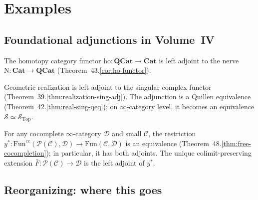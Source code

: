 \section{Examples}
\label{sec:adjunction-examples}

\subsection{Foundational adjunctions in Volume~IV}

\begin{example_thm}
\label{ex:ho-N-adj}
The homotopy category functor $\mathrm{ho} : \mathbf{QCat} \to \mathbf{Cat}$
is left adjoint to the nerve $\mathrm{N} : \mathbf{Cat} \to \mathbf{QCat}$
(Theorem~43.\ref{cor:ho-functor}).
\end{example_thm}

\begin{example_thm}
\label{ex:realization-sing-adj}
Geometric realization is left adjoint to the singular complex functor
(Theorem~39.\ref{thm:realization-sing-adj}). The adjunction is a
Quillen equivalence (Theorem~42.\ref{thm:real-sing-qeq}); on
$\infty$-category level, it becomes an equivalence
$\mathcal{S} \simeq \mathcal{S}_{\mathrm{Top}}$.
\end{example_thm}

\begin{example_thm}
\label{ex:yoneda-adj}
For any cocomplete $\infty$-category $\mathcal{D}$ and small $\mathcal{C}$,
the restriction $y^* : \mathrm{Fun}^{\mathrm{cc}}(\mathcal{P}(\mathcal{C}),
\mathcal{D}) \to \mathrm{Fun}(\mathcal{C}, \mathcal{D})$ is an equivalence
(Theorem~48.\ref{thm:free-cocompletion}); in particular, it has both
adjoints. The unique colimit-preserving extension $\bar F : \mathcal{P}(\mathcal{C})
\to \mathcal{D}$ is the left adjoint of $y^*$.
\end{example_thm}

\subsection{Reorganizing: where this goes}


